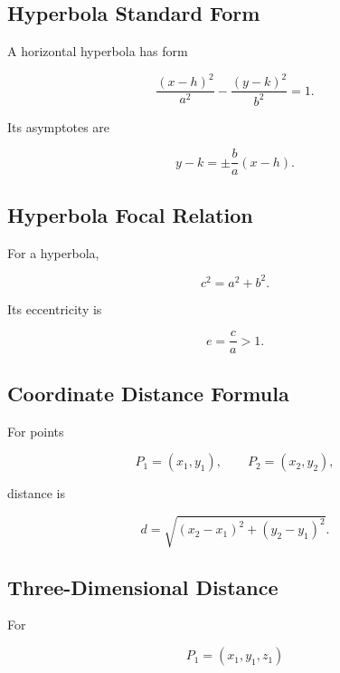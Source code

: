 \subsection{Hyperbola Standard Form}
\label{subsec:hyperbola-standard-reference}

A horizontal hyperbola has form

\[
\boxed{
\frac{(x-h)^2}{a^2}
-
\frac{(y-k)^2}{b^2}
=
1.
}
\]

Its asymptotes are

\[
\boxed{
y-k
=
\pm
\frac{b}{a}
(x-h).
}
\]

\subsection{Hyperbola Focal Relation}
\label{subsec:hyperbola-focal-relation}

For a hyperbola,

\[
\boxed{
c^2
=
a^2+b^2.
}
\]

Its eccentricity is

\[
\boxed{
e
=
\frac{c}{a}
>
1.
}
\]

\subsection{Coordinate Distance Formula}
\label{subsec:coordinate-distance-formula}

For points

\[
P_1=(x_1,y_1),
\qquad
P_2=(x_2,y_2),
\]

distance is

\[
\boxed{
d
=
\sqrt{
(x_2-x_1)^2
+
(y_2-y_1)^2
}.
}
\]

\subsection{Three-Dimensional Distance}
\label{subsec:three-dimensional-distance}

For

\[
P_1=(x_1,y_1,z_1)
\]

